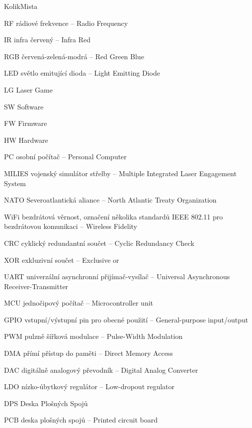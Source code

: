 \begin{seznamzkratek}{KolikMista}

    {RF}
    {rádiové frekvence -- Radio Frequency}

        {IR}
        {infra červený -- Infra Red}

        {RGB}
        {červená-zelená-modrá -- Red Green Blue}

        {LED}
        {světlo emitující dioda -- Light Emitting Diode}

        {LG}
        {Laser Game}

        {SW}
        {Software}

        {FW}
        {Firmware}

        {HW}
        {Hardware}

        {PC}
        {osobní počítač -- Personal Computer}

        {MILIES}
        {vojenský simulátor střelby -- Multiple Integrated Laser Engagement System}

        {NATO}
        {Severoatlantická aliance -- North Atlantic Treaty Organization}

        {WiFi}
        {bezdrátová věrnost, označení několika standardů IEEE 802.11 pro bezdrátovou komunikaci -- Wireless Fidelity}

        {CRC}
        {cyklický redundantní součet --  Cyclic Redundancy Check}

        {XOR}
        {exkluzivní součet --  Exclusive or}

        {UART}
        {univerzální asynchronní přijímač-vysílač --  Universal Asynchronous Receiver-Transmitter}

        {MCU}
        {jednočipový počítač --  Microcontroller unit}

        {GPIO}
        {vstupní/výstupní pin pro obecné použití --  General-purpose input/output}

        {PWM}
        {pulzně šířková modulace --  Pulse-Width Modulation}

        {DMA}
        {přímí přístup do paměti --  Direct Memory Access}

        {DAC}
        {digitálně analogový převodník --  Digital Analog Converter}

        {LDO}
        {nízko-úbytkový regulátor --  Low-dropout regulator}

        {DPS}
        {Deska Plošných Spojů}

        {PCB}
        {deska plošných spojů --  Printed circuit board}

\end{seznamzkratek}
